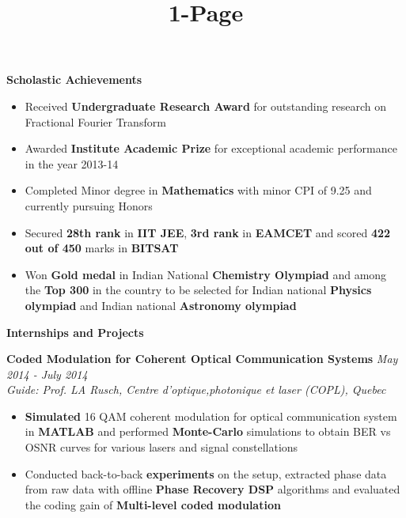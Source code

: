 \documentclass[a4paper,10pt]{article}
\title{1-Page}
\newcommand{\resheading}[1]{
	{\large \colorbox{mygrey}{\begin{minipage}{\textwidth}{\textbf{#1 \vphantom{p\^{E}}}}\end{minipage}}}
}
\newcommand{\ressubheadingWithGuide}[3]{%
	\textbf{#1} \hfill \textit{#2}\null\\
	\textit{\small #3} %
	\vspace{-6pt}
}
\begin{document}
\vspace*{1.2in}

\newcommand{\mywebheader}{
\begin{tabular*}{7in}{l@{\extracolsep{\fill}}r}
	\textbf{\href{http://www.home.iitb.ac.in/~sasank}{\LARGE Sasank Chilamkurthy}} & \href{mailto:sasank@iitb.ac.in}{sasank@iitb.ac.in}\\
	 & \href{http://home.iitb.ac.in/~sasank}{http://home.iitb.ac.in/\textasciitilde sasank} \\
	\end{tabular*}
\\
\vspace{0.1in}}

\resheading{Scholastic Achievements} 
	\begin{itemize} \itemsep -2pt
    	\item Received \textbf{Undergraduate Research Award} for outstanding research on Fractional Fourier Transform
		\item Awarded \textbf{Institute Academic Prize} for exceptional academic performance in the year 2013-14
        \item Completed Minor degree in \textbf{Mathematics} with minor CPI of 9.25 and currently pursuing Honors
		\item Secured \textbf{28th rank} in \textbf{IIT JEE}, \textbf{3rd rank} in \textbf{EAMCET} and scored \textbf{422 out of 450} marks in \textbf{BITSAT}
		\item Won \textbf{Gold medal} in Indian National \textbf{Chemistry Olympiad} and among the \textbf{Top 300} in the country to be selected for Indian national \textbf{Physics olympiad} and Indian national \textbf{Astronomy olympiad}
    \end{itemize}
\resheading{Internships and Projects}

			\ressubheadingWithGuide{Coded Modulation for Coherent Optical Communication Systems}{May 2014 - July 2014}{Guide: Prof. LA Rusch, Centre d'optique,photonique et laser (COPL), Quebec}
            	\begin{itemize}\itemsep -2pt
                	\item \textbf{Simulated} 16 QAM coherent modulation for optical communication system in \textbf{MATLAB} and performed \textbf{Monte-Carlo} simulations to obtain BER vs OSNR curves for various lasers and signal constellations
					\item Conducted back-to-back \textbf{experiments} on the setup, extracted phase data from raw data with offline \textbf{Phase Recovery DSP} algorithms and evaluated the coding gain of \textbf{Multi-level coded modulation}
	    		\end{itemize}
\end{document}
